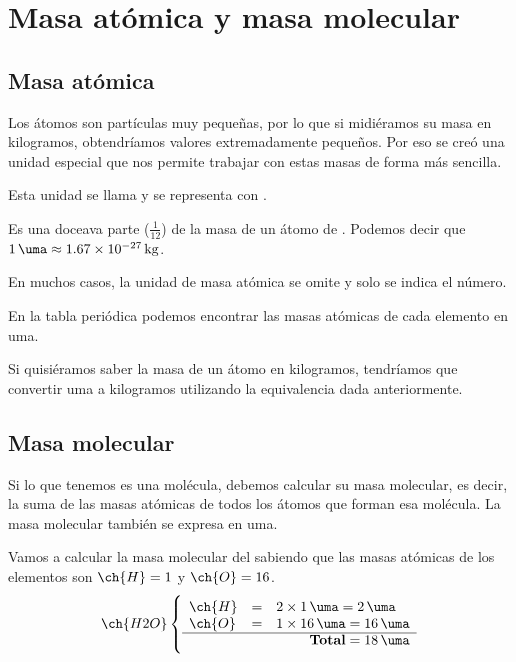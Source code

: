 \section{Masa atómica y masa molecular}

\subsection{Masa atómica}
Los átomos son partículas muy pequeñas, por lo que si midiéramos su masa en kilogramos, obtendríamos valores extremadamente pequeños. Por eso se creó una unidad especial que nos permite trabajar con estas masas de forma más sencilla.

Esta unidad se llama  y se representa con \unit{\uma}.

\begin{definition}
    Es una doceava parte (\( \frac{1}{12} \)) de la masa de un átomo de . Podemos decir que \( \qty{1}{\uma} \approx \qty{1.67e-27}{\kilogram} \).
\end{definition}

En muchos casos, la unidad de masa atómica se omite y solo se indica el número.

En la tabla periódica podemos encontrar las masas atómicas de cada elemento en uma.

Si quisiéramos saber la masa de un átomo en kilogramos, tendríamos que convertir uma a kilogramos utilizando la equivalencia dada anteriormente.

\subsection{Masa molecular}

Si lo que tenemos es una molécula, debemos calcular su masa molecular, es decir, la suma de las masas atómicas de todos los átomos que forman esa molécula. La masa molecular también se expresa en uma.

\begin{example}{}
    Vamos a calcular la masa molecular del  sabiendo que las masas atómicas de los elementos son \( \ch{H} = 1 \) y \( \ch{O} = 16 \).
    \[
        \ch{H2O} \left\{\rule{0pt}{0.8cm}
                     \begin{array}{lcl}
                         \ch{H} &=& 2 \times \qty{1}{\uma} = \qty{2}{\uma} \\
                         \ch{O} &=& 1 \times \qty{16}{\uma} = \qty{16}{\uma} \\
                         \cline{1-3}
                         \multicolumn{3}{r}{\textbf{Total} = \qty{18}{\uma}}
                     \end{array}
        \right.
    \]
\end{example}

